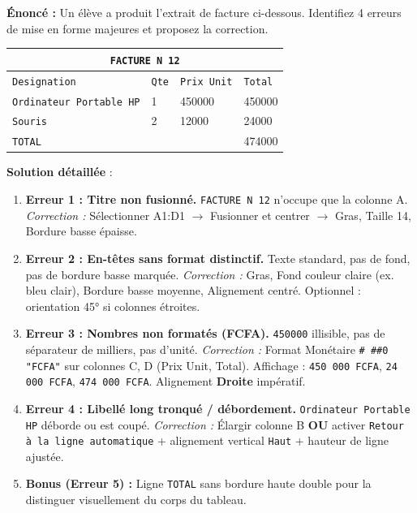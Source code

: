 \documentclass[11pt]{article}
\begin{document}
\begin{exoresolu}
\textbf{Énoncé :} Un élève a produit l'extrait de facture ci-dessous. Identifiez 4 erreurs de mise en forme majeures et proposez la correction.

\begin{center}
\begin{tabular}{|l|l|l|l|}
\hline
\multicolumn{4}{|c|}{\texttt{FACTURE N 12}} \\ \hline
\texttt{Designation} & \texttt{Qte} & \texttt{Prix Unit} & \texttt{Total} \\ \hline
\texttt{Ordinateur Portable HP} & 1 & 450000 & 450000 \\ \hline
\texttt{Souris} & 2 & 12000 & 24000 \\ \hline
\texttt{TOTAL} & & & 474000 \\ \hline
\end{tabular}
\end{center}

\textbf{Solution détaillée} :
\begin{enumerate}
    \item \textbf{Erreur 1 : Titre non fusionné.} \texttt{FACTURE N 12} n'occupe que la colonne A. \emph{Correction :} Sélectionner A1:D1 $\to$ Fusionner et centrer $\to$ Gras, Taille 14, Bordure basse épaisse.
    \item \textbf{Erreur 2 : En-têtes sans format distinctif.} Texte standard, pas de fond, pas de bordure basse marquée. \emph{Correction :} Gras, Fond couleur claire (ex. bleu clair), Bordure basse moyenne, Alignement centré. Optionnel : orientation 45° si colonnes étroites.
    \item \textbf{Erreur 3 : Nombres non formatés (FCFA).} \texttt{450000} illisible, pas de séparateur de milliers, pas d'unité. \emph{Correction :} Format Monétaire \texttt{\# \#\#0 "FCFA"} sur colonnes C, D (Prix Unit, Total). Affichage : \texttt{450 000 FCFA}, \texttt{24 000 FCFA}, \texttt{474 000 FCFA}. Alignement \textbf{Droite} impératif.
    \item \textbf{Erreur 4 : Libellé long tronqué / débordement.} \texttt{Ordinateur Portable HP} déborde ou est coupé. \emph{Correction :} Élargir colonne B \textbf{OU} activer \texttt{Retour à la ligne automatique} + alignement vertical \texttt{Haut} + hauteur de ligne ajustée.
    \item \textbf{Bonus (Erreur 5) :} Ligne \texttt{TOTAL} sans bordure haute double pour la distinguer visuellement du corps du tableau.
\end{enumerate}
\end{exoresolu}
\end{document}
